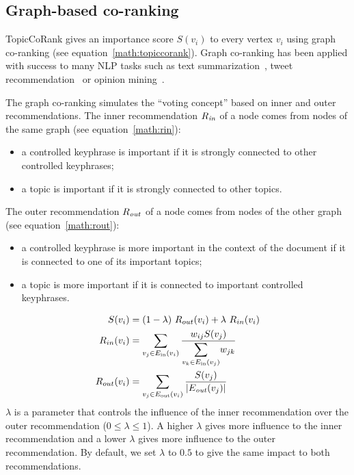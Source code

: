   \subsection{Graph-based co-ranking}
  \label{subsec:graph_based_co_ranking}
    TopicCoRank gives an importance score $S(v_i)$ to every vertex
    $v_i$ using graph co-ranking (see equation~\ref{math:topiccorank}).
    Graph co-ranking has been applied with success to many NLP tasks 
    such as text summarization~\cite{wan2011corankingsummarization}, 
    tweet recommendation~\cite{yan2012corankingtweetrecommendation} or 
    opinion mining~\cite{liu2014corankingopinionmining}.
    
    The
    graph co-ranking simulates the ``voting concept'' based on inner and outer
    recommendations. The inner recommendation $R_\textnormal{\textit{in}}$ of a
    node comes from nodes of the same graph (see equation~\ref{math:rin}):
    \begin{itemize}
      \item{a controlled keyphrase is important if it is strongly connected to other
            controlled keyphrases;}
      \item{a topic is important if it is strongly connected to other topics.}
    \end{itemize}
    The outer recommendation $R_\textnormal{\textit{out}}$ of a node comes from nodes
    of the other graph (see equation~\ref{math:rout}):
    \begin{itemize}
      \item{a controlled keyphrase is more important in the context of the document if it
            is connected to one of its important topics;}
      \item{a topic is more important if it is connected to important controlled keyphrases.}
    \end{itemize}
    \begin{align}
      S(v_i) &= (1 - \lambda)\ R_{out}(v_i) + \lambda\ R_{in}(v_i)\label{math:topiccorank}\\
      R_{in}(v_i) &= \sum_{v_j \in E_{\text{in}}(v_i)}{\frac{w_{ij} S(v_j)}{\mathlarger\sum_{v_k \in E_{\text{in}}(v_j)}{{w_{jk}}}}}\label{math:rin}\\
      R_{out}(v_i) &= \sum_{v_j \in E_{\text{out}}(v_i)}{\frac{S(v_j)}{|E_{\text{\textit{out}}}(v_j)|}}\label{math:rout}
    \end{align}
    $\lambda$ is a parameter that controls the influence of the inner recommendation
    over the outer recommendation ($0 \leq \lambda \leq 1$). A higher $\lambda$
    gives more influence to the inner recommendation and a lower $\lambda$ gives
    more influence to the outer recommendation. By default, we set $\lambda$ to $0.5$
    to give the same impact to both recommendations.

